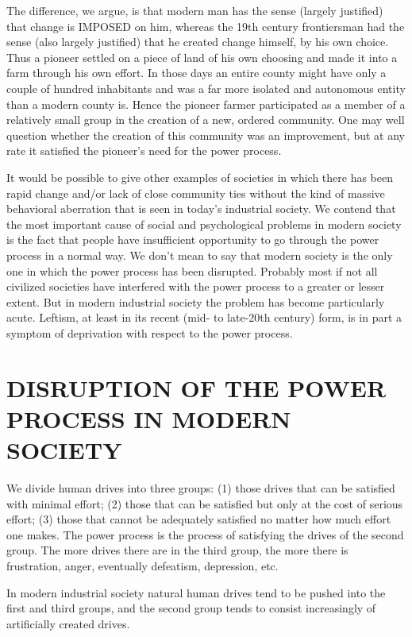  The difference, we argue, is that modern man has the sense (largely justified) that change is IMPOSED on him, whereas the 19th century frontiersman had the sense (also largely justified) that he created change himself, by his own choice. Thus a pioneer settled on a piece of land of his own choosing and made it into a farm through his own effort. In those days an entire county might have only a couple of hundred inhabitants and was a far more isolated and autonomous entity than a modern county is. Hence the pioneer farmer participated as a member of a relatively small group in the creation of a new, ordered community. One may well question whether the creation of this community was an improvement, but at any rate it satisfied the pioneer’s need for the power process.

 It would be possible to give other examples of societies in which there has been rapid change and/or lack of close community ties without the kind of massive behavioral aberration that is seen in today’s industrial society. We contend that the most important cause of social and psychological problems in modern society is the fact that people have insufficient opportunity to go through the power process in a normal way. We don’t mean to say that modern society is the only one in which the power process has been disrupted. Probably most if not all civilized societies have interfered with the power process to a greater or lesser extent. But in modern industrial society the problem has become particularly acute. Leftism, at least in its recent (mid- to late-20th century) form, is in part a symptom of deprivation with respect to the power process.

\chapter{DISRUPTION OF THE POWER PROCESS IN MODERN SOCIETY}

 We divide human drives into three groups: (1) those drives that can be satisfied with minimal effort; (2) those that can be satisfied but only at the cost of serious effort; (3) those that cannot be adequately satisfied no matter how much effort one makes. The power process is the process of satisfying the drives of the second group. The more drives there are in the third group, the more there is frustration, anger, eventually defeatism, depression, etc.

 In modern industrial society natural human drives tend to be pushed into the first and third groups, and the second group tends to consist increasingly of artificially created drives.

